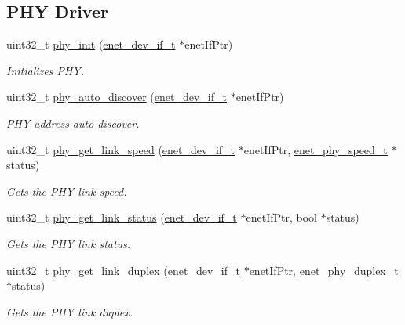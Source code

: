 \subsection*{P\+HY Driver}
\begin{DoxyCompactItemize}
\item 
uint32\+\_\+t \hyperlink{group__phy__driver_gaf2858e0c30b833bf5e08d267e0f5a7cc}{phy\+\_\+init} (\hyperlink{group__enet__driver_ga497f30fbc93952e93d9fb8cf78480b75}{enet\+\_\+dev\+\_\+if\+\_\+t} $\ast$enet\+If\+Ptr)
\begin{DoxyCompactList}\small\item\em Initializes P\+HY. \end{DoxyCompactList}\item 
uint32\+\_\+t \hyperlink{group__phy__driver_ga78dc8c34e1e4617817ee6c15b5be4e94}{phy\+\_\+auto\+\_\+discover} (\hyperlink{group__enet__driver_ga497f30fbc93952e93d9fb8cf78480b75}{enet\+\_\+dev\+\_\+if\+\_\+t} $\ast$enet\+If\+Ptr)
\begin{DoxyCompactList}\small\item\em P\+HY address auto discover. \end{DoxyCompactList}\item 
uint32\+\_\+t \hyperlink{group__phy__driver_ga171da61f37921e88f0a2da126a01e852}{phy\+\_\+get\+\_\+link\+\_\+speed} (\hyperlink{group__enet__driver_ga497f30fbc93952e93d9fb8cf78480b75}{enet\+\_\+dev\+\_\+if\+\_\+t} $\ast$enet\+If\+Ptr, \hyperlink{group__phy__driver_ga6525c0ff103f370287f9995e8761b325}{enet\+\_\+phy\+\_\+speed\+\_\+t} $\ast$status)
\begin{DoxyCompactList}\small\item\em Gets the P\+HY link speed. \end{DoxyCompactList}\item 
uint32\+\_\+t \hyperlink{group__phy__driver_gab8a249e13852fa30c49d5cbfed6c6bce}{phy\+\_\+get\+\_\+link\+\_\+status} (\hyperlink{group__enet__driver_ga497f30fbc93952e93d9fb8cf78480b75}{enet\+\_\+dev\+\_\+if\+\_\+t} $\ast$enet\+If\+Ptr, bool $\ast$status)
\begin{DoxyCompactList}\small\item\em Gets the P\+HY link status. \end{DoxyCompactList}\item 
uint32\+\_\+t \hyperlink{group__phy__driver_ga7f614eb1dd43de9aeb3fb3ebea76d1b6}{phy\+\_\+get\+\_\+link\+\_\+duplex} (\hyperlink{group__enet__driver_ga497f30fbc93952e93d9fb8cf78480b75}{enet\+\_\+dev\+\_\+if\+\_\+t} $\ast$enet\+If\+Ptr, \hyperlink{group__phy__driver_ga0c6955577513a799936696749860cf0b}{enet\+\_\+phy\+\_\+duplex\+\_\+t} $\ast$status)
\begin{DoxyCompactList}\small\item\em Gets the P\+HY link duplex. \end{DoxyCompactList}\end{DoxyCompactItemize}


